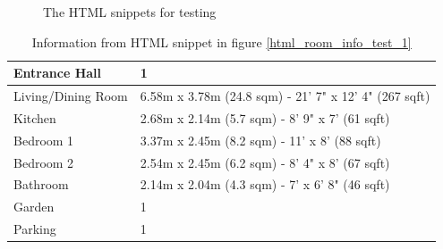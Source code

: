 \documentclass[12pt,twoside]{report}
\begin{document}
\begin{figure}[h]
	\centering
	\hfill
	\caption{The HTML snippets for testing}
	\label{html_room_info_test}
\end{figure}

\begin{table}[h]
	\centering
	\caption{Information from HTML snippet in figure \ref{html_room_info_test_1}}
	\begin{tabular} {| l | l |}
		\hline
		Entrance Hall & 1\\
		\hline
		Living/Dining Room & 6.58m x 3.78m (24.8 sqm) - 21' 7" x 12' 4" (267 sqft)\\
		\hline
		Kitchen & 2.68m x 2.14m (5.7 sqm) - 8' 9" x 7' (61 sqft)\\
		\hline
		Bedroom 1 & 3.37m x 2.45m (8.2 sqm) - 11' x 8' (88 sqft)\\
		\hline
		Bedroom 2 & 2.54m x 2.45m (6.2 sqm) - 8' 4" x 8' (67 sqft)\\
		\hline 
		Bathroom & 2.14m x 2.04m (4.3 sqm) - 7' x 6' 8" (46 sqft)\\
		\hline
		Garden & 1\\
		\hline
		Parking & 1\\
		\hline
	\end{tabular}
	\label{html_room_info_expect_1}
\end{table}
\end{document}
